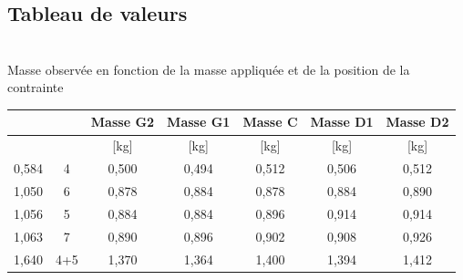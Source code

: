 \documentclass[11pt,a4paper]{report}
\begin{document}
\subsection*{Tableau de valeurs}
\begin{center}
~\\
Masse observée en fonction de la masse appliquée et de la position de la contrainte
\begin{tabular}{|c|c|c|c|c|c|c|}
\hline
\rowcolor[HTML]{036400} 
\cellcolor[HTML]{963400}{\color[HTML]{FFFFFF} N}        & \cellcolor[HTML]{963400}{\color[HTML]{FFFFFF} N} & {\color[HTML]{FFFFFF} Masse G2} & {\color[HTML]{FFFFFF} Masse G1} & {\color[HTML]{FFFFFF} Masse C}  & {\color[HTML]{FFFFFF} Masse D1} & {\color[HTML]{FFFFFF} Masse D2} \\ \hline
\rowcolor[HTML]{E7F7E7} 
\cellcolor[HTML]{FFECE2}{\color[HTML]{963400} {[}kg{]}} & \cellcolor[HTML]{FFECE2}{\color[HTML]{963400} }  & {\color[HTML]{036400} {[}kg{]}} & {\color[HTML]{036400} {[}kg{]}} & {\color[HTML]{036400} {[}kg{]}} & {\color[HTML]{036400} {[}kg{]}} & {\color[HTML]{036400} {[}kg{]}} \\ \hline
{\color[HTML]{963400} 0,584}                            & {\color[HTML]{963400} 4}                         & {\color[HTML]{036400} 0,500}    & {\color[HTML]{036400} 0,494}    & {\color[HTML]{036400} 0,512}    & {\color[HTML]{036400} 0,506}    & {\color[HTML]{036400} 0,512}    \\ \hline
{\color[HTML]{963400} 1,050}                            & {\color[HTML]{963400} 6}                         & {\color[HTML]{036400} 0,878}    & {\color[HTML]{036400} 0,884}    & {\color[HTML]{036400} 0,878}    & {\color[HTML]{036400} 0,884}    & {\color[HTML]{036400} 0,890}    \\ \hline
{\color[HTML]{963400} 1,056}                            & {\color[HTML]{963400} 5}                         & {\color[HTML]{036400} 0,884}    & {\color[HTML]{036400} 0,884}    & {\color[HTML]{036400} 0,896}    & {\color[HTML]{036400} 0,914}    & {\color[HTML]{036400} 0,914}    \\ \hline
{\color[HTML]{963400} 1,063}                            & {\color[HTML]{963400} 7}                         & {\color[HTML]{036400} 0,890}    & {\color[HTML]{036400} 0,896}    & {\color[HTML]{036400} 0,902}    & {\color[HTML]{036400} 0,908}    & {\color[HTML]{036400} 0,926}    \\ \hline
{\color[HTML]{963400} 1,640}                            & {\color[HTML]{963400} 4+5}                       & {\color[HTML]{036400} 1,370}    & {\color[HTML]{036400} 1,364}    & {\color[HTML]{036400} 1,400}    & {\color[HTML]{036400} 1,394}    & {\color[HTML]{036400} 1,412}    \\ \hline

\end{tabular}
\end{center}
\end{document}
